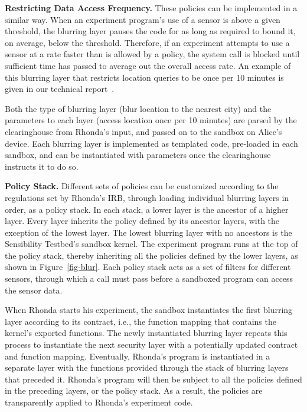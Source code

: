 \textbf{Restricting Data Access Frequency.}
These policies can be implemented in a similar way. When an experiment 
program's use of a sensor is above a given threshold, the blurring layer 
pauses the code for as long as required to bound it, on average, below 
the threshold. Therefore, if an experiment attempts to use a sensor at a 
rate faster than is allowed by a policy, the system call is blocked until 
sufficient time has passed to average out the overall access rate. An example
of this blurring layer that restricts location queries to be once per 10 minutes
is given in our technical report~\cite{zhuangTR15}.

Both the type of blurring layer (blur location to the nearest city) and the 
parameters to each layer (access location once per 10 minutes) are parsed
by the clearinghouse from Rhonda's input, and passed on to the sandbox on 
Alice's device. Each blurring layer is implemented as templated code, 
pre-loaded in each sandbox, and can be instantiated with parameters 
once the clearinghouse instructs it to do so.

\textbf{Policy Stack.}
Different sets of policies can be customized 
according to the regulations set by Rhonda's IRB, through loading 
individual blurring layers in order, as a policy stack. In each stack, 
a lower layer is the ancestor of a higher layer. Every layer inherits 
the policy defined by its ancestor layers, with the exception of the lowest layer. 
The lowest blurring layer with no ancestors is the 
Sensibility Testbed's sandbox kernel. The experiment program runs at the top 
of the policy stack, thereby inheriting all the policies defined by the
lower layers, as shown in Figure~\ref{fig-blur}. 
Each policy stack acts as a set of filters for different sensors, through 
which a call must pass before a sandboxed program can
access the sensor data. 

When Rhonda starts his experiment, the sandbox %
instantiates the first blurring layer according to its contract, i.e., the function 
mapping that contains the kernel's exported functions.
The newly instantiated blurring layer repeats this process 
to instantiate the next security layer with a potentially updated contract and 
function mapping. Eventually, Rhonda's program is instantiated
in a separate layer with the functions provided
through the stack of blurring layers that preceded it.
Rhonda's program will then be subject to all the 
policies defined in the preceding layers, or the policy stack. 
As a result,  the policies are transparently applied to Rhonda's experiment code. 

